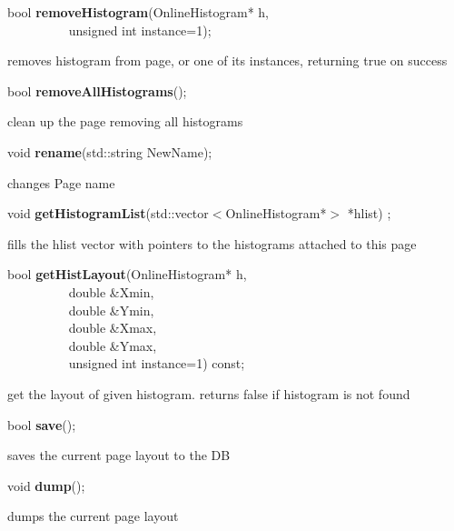 \item    bool {\bf removeHistogram}(OnlineHistogram* h,\\\mbox{}~~~~~~~~~
		       unsigned int instance=1);

 removes histogram from page, or one of its instances, returning true on success


\item    bool {\bf removeAllHistograms}();


 clean up the page removing all histograms


\item    void {\bf rename}(std::string NewName);


 changes Page name 


\item    void {\bf getHistogramList}(std::vector$<$OnlineHistogram*$>$ *hlist) ;

 fills the hlist vector with pointers to the histograms attached to this page


\item    bool {\bf getHistLayout}(OnlineHistogram* h,\\\mbox{}~~~~~~~~~
		     double \&Xmin,\\\mbox{}~~~~~~~~~
		     double \&Ymin,\\\mbox{}~~~~~~~~~
		     double \&Xmax,\\\mbox{}~~~~~~~~~
		     double \&Ymax,\\\mbox{}~~~~~~~~~
		     unsigned int instance=1) const;

 get the layout of given histogram. returns false if histogram is not found


\item    bool {\bf save}();


 saves the current page layout to the DB


\item    void {\bf dump}();


 dumps the current page layout 


